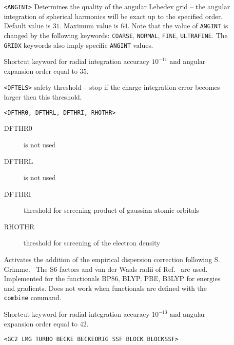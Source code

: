 \begin{description}
\item[] \verb||\newline
\verb|<ANGINT>|\newline
Determines the quality of the angular Lebedev grid -- the angular
integration of spherical harmonics will be exact up to the specified
order. Default value is $31$. Maximum value is $64$.
Note that the value of \verb|ANGINT| is changed by the following keywords:
\verb|COARSE|, \verb|NORMAL|, \verb|FINE|, \verb|ULTRAFINE|.
The \verb|GRIDX| keywords also imply specific \verb|ANGINT| values.
\item[]
Shortcut keyword for radial integration accuracy $10^{-11}$ and angular expansion order equal to $35$.
\item[] \verb||\newline
\verb|<DFTELS>|\newline
safety threshold -- stop if the charge integration error becomes larger then this threshold.
\item[]\verb||\newline
\verb|<DFTHR0, DFTHRL, DFTHRI, RHOTHR>|
\begin{description}
\item[DFTHR0] is not used 
\item[DFTHRL] is not used 
\item[DFTHRI] threshold for screening product of gaussian atomic orbitals
\item[RHOTHR] threshold for screening of the electron density 
\end{description}
\item[] 
Activates the addition of the empirical dispersion correction following S. Grimme.~\cite{dft-disp:Grimme1,dft-disp:Grimme2} The S6 factors and van der Waals radii of Ref.~\cite{dft-disp:Grimme2} are used.
Implemented for the functionals BP86, BLYP, PBE, B3LYP for energies and gradients. 
Does not work when functionals are defined with the \verb|combine| command.
\item[]
Shortcut keyword for radial integration accuracy $10^{-13}$ and angular expansion order equal to $42$.
\item[] \verb||\newline
\verb|<GC2 LMG TURBO BECKE BECKEORIG SSF BLOCK BLOCKSSF>|\newline

\end{description}
